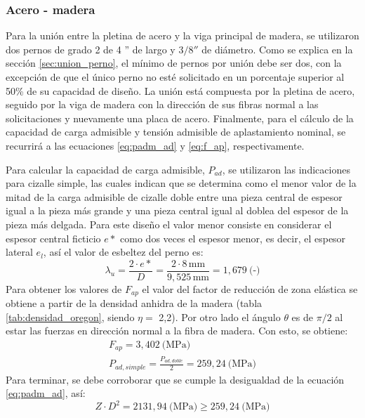 \subsubsection{Acero - madera}
Para la unión entre la pletina de acero y la viga principal de madera, se utilizaron dos pernos de grado 2 de 4 '' de largo y  $3/8''$ de diámetro. Como se explica en la sección \ref{sec:union_perno}, el mínimo de pernos por unión debe ser dos, con la excepción de que el único perno no esté solicitado en un porcentaje superior al 50\% de su capacidad de diseño. La unión está compuesta por la pletina de acero, seguido por la viga de madera con la dirección de sus fibras normal a las solicitaciones y nuevamente una placa de acero. Finalmente, para el cálculo de la capacidad de carga admisible y tensión admisible de aplastamiento nominal, se recurrirá a las ecuaciones \ref{eq:padm_ad} y \ref{eq:f_ap}, respectivamente. 

Para calcular la capacidad de carga admisible, $P_{ad}$, se utilizaron las indicaciones para cizalle simple, las cuales indican que se determina como el menor valor de la mitad de la carga admisible de cizalle doble entre una pieza central de espesor igual a la pieza más grande y una pieza central igual al doblea del espesor de la pieza más delgada. Para este diseño el valor menor consiste en considerar el espesor central ficticio $e*$ como dos veces el espesor menor, es decir, el espesor lateral $e_l$, así el valor de esbeltez del perno es:  
\begin{equation*}
	\lambda_u = \frac{2\cdot e*}{D} = \frac{2\cdot 8\, \text{mm}}{9,525\, \text{mm}} = 1,679\: \text{(-)}
\end{equation*}
Para obtener los valores de $F_{ap}$ el valor del factor de reducción de zona elástica se obtiene a partir de la densidad anhidra de la madera (tabla \ref{tab:densidad_oregon}, siendo $\eta =$ 2,2). Por otro lado el ángulo $\theta$ es de $\pi/2$ al estar las fuerzas en dirección normal a la fibra de madera. Con esto, se obtiene:
\begin{gather}
	F_{ap} = 3,402 \: \text{(MPa)} \\
	P_{ad,simple} =\frac{P_{ad,doble}}{2} = 259,24 \: \text{(MPa)}
\end{gather}
Para terminar, se debe corroborar que se cumple la desigualdad de la ecuación \ref{eq:padm_ad}, así:
\begin{equation*}
	Z\cdot D^2 = 2131,94 \: \text{(MPa)} \geq 259,24 \: \text{(MPa)}
\end{equation*}

